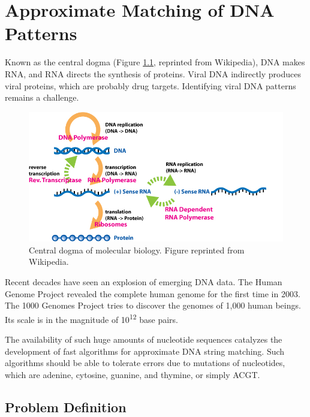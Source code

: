 \chapter{Approximate Matching of DNA Patterns}

Known as the central dogma (Figure \ref{fig:CentralDogma}, reprinted from Wikipedia), DNA makes RNA, and RNA directs the synthesis of proteins. Viral DNA indirectly produces viral proteins, which are probably drug targets. Identifying viral DNA patterns remains a challenge.

\begin{figure}
\centering
\includegraphics[width=\textwidth]{SequenceMatching/Figures/CentralDogma.jpg}
\caption{Central dogma of molecular biology. Figure reprinted from Wikipedia.}
\label{fig:CentralDogma}
\end{figure}

Recent decades have seen an explosion of emerging DNA data. The Human Genome Project \citep{681-1990,682-1998} revealed the complete human genome for the first time in 2003. The 1000 Genomes Project \citep{680-2008,679-2008} tries to discover the genomes of 1,000 human beings. Its scale is in the magnitude of 10\textsuperscript{12} base pairs.

The availability of such huge amounts of nucleotide sequences catalyzes the development of fast algorithms for approximate DNA string matching. Such algorithms should be able to tolerate errors due to mutations of nucleotides, which are adenine, cytosine, guanine, and thymine, or simply ACGT.

\section{Problem Definition}

